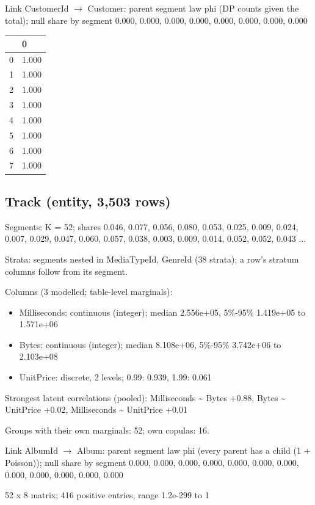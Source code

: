 \documentclass[10pt]{article}
\begin{document}
Link CustomerId $\rightarrow$ Customer: parent segment law phi (DP counts given the total); null share by segment 0.000, 0.000, 0.000, 0.000, 0.000, 0.000, 0.000, 0.000


{\footnotesize\begin{longtable}{ll}
 & 0 \\ \hline
0 & 1.000 \\
1 & 1.000 \\
2 & 1.000 \\
3 & 1.000 \\
4 & 1.000 \\
5 & 1.000 \\
6 & 1.000 \\
7 & 1.000 \\
\end{longtable}}


\subsection*{Track (entity, 3,503 rows)}
Segments: K = 52; shares 0.046, 0.077, 0.056, 0.080, 0.053, 0.025, 0.009, 0.024, 0.007, 0.029, 0.047, 0.060, 0.057, 0.038, 0.003, 0.009, 0.014, 0.052, 0.052, 0.043 ...

Strata: segments nested in MediaTypeId, GenreId (38 strata); a row's stratum columns follow from its segment.

Columns (3 modelled; table-level marginals):


\begin{itemize}
\item Milliseconds: continuous (integer); median 2.556e+05, 5\%-95\% 1.419e+05 to 1.571e+06
\item Bytes: continuous (integer); median 8.108e+06, 5\%-95\% 3.742e+06 to 2.103e+08
\item UnitPrice: discrete, 2 levels; 0.99: 0.939, 1.99: 0.061
\end{itemize}
Strongest latent correlations (pooled): Milliseconds \textasciitilde{} Bytes +0.88, Bytes \textasciitilde{} UnitPrice +0.02, Milliseconds \textasciitilde{} UnitPrice +0.01

Groups with their own marginals: 52; own copulas: 16.


Link AlbumId $\rightarrow$ Album: parent segment law phi (every parent has a child (1 + Poisson)); null share by segment 0.000, 0.000, 0.000, 0.000, 0.000, 0.000, 0.000, 0.000, 0.000, 0.000, 0.000, 0.000


52 x 8 matrix; 416 positive entries, range 1.2e-299 to 1
\end{document}
